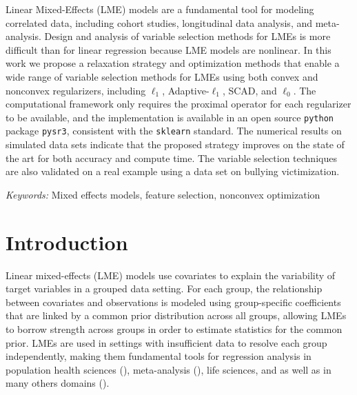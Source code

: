 
Linear Mixed-Effects (LME) models are a fundamental tool for modeling correlated data, 
including cohort studies, longitudinal data analysis, and meta-analysis.  Design and analysis of variable selection methods for LMEs is more difficult than for linear regression because LME models are nonlinear. In this work we 
propose a relaxation strategy and optimization methods that enable a wide range of variable selection methods for LMEs using both convex and nonconvex regularizers, including  $\ell_1$, Adaptive-$\ell_1$, SCAD, and $\ell_0$. 
The computational framework only requires the proximal operator for each regularizer to be available, and the implementation is available in an open source \texttt{python} package \texttt{pysr3}, consistent 
with the \texttt{sklearn} standard. 
The numerical results on simulated data sets indicate that the proposed strategy improves on the state of the art for both accuracy and compute time. 
The variable selection techniques are also validated on a real example using a data set on bullying victimization.

{\it Keywords:}  Mixed effects models, feature selection, nonconvex optimization 
%


\section{Introduction}
Linear mixed-effects (LME) models use covariates 
to explain the variability of target variables in a grouped data setting. For each group, the relationship between covariates and observations is modeled 
using group-specific coefficients that are linked by a common prior distribution
across all groups, allowing LMEs to borrow strength across groups
in order to estimate statistics for the common prior. 
LMEs are used in settings with insufficient data to resolve each group independently, making them 
fundamental tools for regression analysis in 
population health sciences (\cite{covid2020modeling,murray2020global}), meta-analysis (\cite{dersimonian1986meta, zheng2021trimmed}), life sciences, and 
as well as in many others domains (\cite{zuur2009mixed}). 

